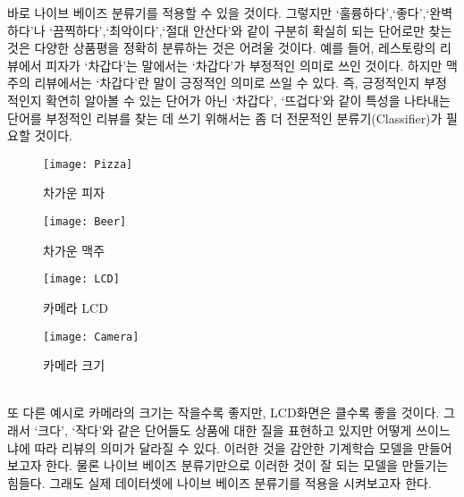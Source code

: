 \documentclass[a4paper]{oblivoir}
\begin{document}
\indent 바로 나이브 베이즈 분류기를 적용할 수 있을 것이다. 그렇지만 `훌륭하다',`좋다',`완벽하다'나 `끔찍하다',`최악이다',`절대 안산다'와 같이 구분히 확실히 되는 단어로만 찾는 것은 다양한 상품평을 정확히 분류하는 것은 어려울 것이다. 예를 들어, 레스토랑의 리뷰에서 피자가 `차갑다'는 말에서는 `차갑다'가 부정적인 의미로 쓰인 것이다. 하지만 맥주의 리뷰에서는 `차갑다'란 말이 긍정적인 의미로 쓰일 수 있다. 즉, 긍정적인지 부정적인지 확연히 알아볼 수 있는 단어가 아닌 `차갑다', `뜨겁다'와 같이 특성을 나타내는 단어를 부정적인 리뷰를 찾는 데 쓰기 위해서는 좀 더 전문적인 분류기(Classifier)가 필요할 것이다.
\begin{figure}[ht]\centering
\parbox[t]{4cm}{\texttt{[image: Pizza]}\caption{차가운 피자}\label{Fig:3-12}}\hspace{1cm}
\parbox[t]{4cm}{\texttt{[image: Beer]}\caption{차가운 맥주}\label{Fig:3-13}}
\end{figure}
\begin{figure}[ht]\centering
\parbox[t]{4cm}{\texttt{[image: LCD]}\caption{카메라 LCD}\label{Fig:3-14}}\hspace{1cm}
\parbox[t]{4cm}{\texttt{[image: Camera]}\caption{카메라 크기}\label{Fig:3-15}}
\end{figure}\\
\indent 또 다른 예시로 카메라의 크기는 작을수록 좋지만, LCD화면은 클수록 좋을 것이다. 그래서 `크다', `작다'와 같은 단어들도 상품에 대한 질을 표현하고 있지만 어떻게 쓰이느냐에 따라 리뷰의 의미가 달라질 수 있다. 이러한 것을 감안한 기계학습 모델을 만들어 보고자 한다. 물론 나이브 베이즈 분류기만으로 이러한 것이 잘 되는 모델을 만들기는 힘들다. 그래도 실제 데이터셋에 나이브 베이즈 분류기를 적용을 시켜보고자 한다.

\end{document}
